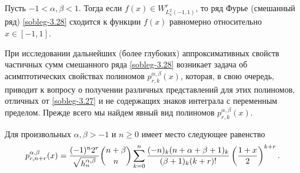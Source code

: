 \begin{corollary}
Пусть $-1<\alpha,\beta<1$. Тогда если $f(x)\in W^r_{L^2_\kappa(-1,1)}$, то ряд Фурье (смешанный ряд) \eqref{sobleg-3.28} сходится к функции $f(x)$ равномерно относительно $x\in[-1,1]$.
\end{corollary}

При исследовании дальнейших (более глубоких) аппроксимативных свойств частичных сумм смешанного ряда \eqref{sobleg-3.28} возникает задача об асимптотических свойствах полиномов $p_{r,k}^{\alpha,\beta}(x)$, которая, в свою очередь, приводит к вопросу о получении различных представлений для этих полиномов, отличных от  \eqref{sobleg-3.27} и не содержащих знаков интеграла с переменным пределом. Прежде всего мы найдем явный вид полиномов $p_{r,k}^{\alpha,\beta}(x)$.

\begin{theorem}\label{soblegtheo1}
Для произвольных $\alpha, \beta>-1$ и $n\ge0$
имеет место следующее равенство
\begin{equation}\label{sobleg-3.30}
p_{r,n+r}^{\alpha,\beta}(x)=\frac{(-1)^n2^{r}}{\sqrt{ h_n^{\alpha,\beta}}}
{n+\beta\choose n}
\sum_{k=0}^n{(-n)_k(n+\alpha+\beta+1)_k\over (\beta+1)_k(k+r)!}
\left({1+x\over 2}\right)^{k+r}.
\end{equation}
\end{theorem}


